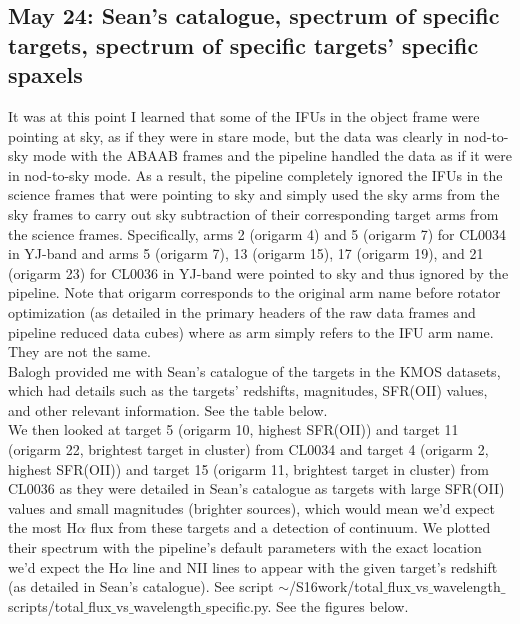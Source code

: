 \documentclass[10pt,letterpaper]{article}
\begin{document}
\subsection{May 24: Sean's catalogue, spectrum of specific targets, spectrum of specific targets' specific spaxels}
It was at this point I learned that some of the IFUs in the object frame were pointing at sky, as if they were in stare mode, but the data was clearly in nod-to-sky mode with the ABAAB frames and the pipeline handled the data as if it were in nod-to-sky mode. As a result, the pipeline completely ignored the IFUs in the science frames that were pointing to sky and simply used the sky arms from the sky frames to carry out sky subtraction of their corresponding target arms from the science frames. Specifically, arms 2 (origarm 4) and 5 (origarm 7) for CL0034 in YJ-band and arms 5 (origarm 7), 13 (origarm 15), 17 (origarm 19), and 21 (origarm 23) for CL0036 in YJ-band were pointed to sky and thus ignored by the pipeline. Note that origarm corresponds to the original arm name before rotator optimization (as detailed in the primary headers of the raw data frames and pipeline reduced data cubes) where as arm simply refers to the IFU arm name. They are not the same.\\

Balogh provided me with Sean's catalogue of the targets in the KMOS datasets, which had details such as the targets' redshifts, magnitudes, SFR(OII) values, and other relevant information. See the table below.\\


We then looked at target 5 (origarm 10, highest SFR(OII)) and target 11 (origarm 22, brightest target in cluster) from CL0034 and target 4 (origarm 2, highest SFR(OII)) and target 15 (origarm 11, brightest target in cluster) from CL0036 as they were detailed in Sean's catalogue as targets with large SFR(OII) values and small magnitudes (brighter sources), which would mean we'd expect the most H$\alpha$ flux from these targets and a detection of continuum. We plotted their spectrum with the pipeline's default parameters with the exact location we'd expect the H$\alpha$ line and NII lines to appear with the given target's redshift (as detailed in Sean's catalogue). See script $\sim$/S16work/total$\_$flux$\_$vs$\_$wavelength$\_$scripts/total$\_$flux$\_$vs$\_$wavelength$\_$specific.py. See the figures below.\\
\end{document}

